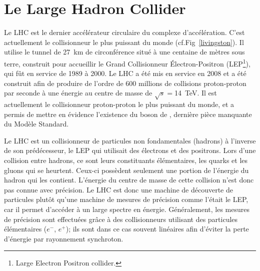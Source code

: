 \section{Le Large Hadron Collider}
Le LHC est le dernier accélérateur circulaire du complexe d'accélération. C'est actuellement le collisionneur le plus puissant du monde (cf.Fig~\ref{livingston}). Il utilise le tunnel de \SI{27}{\kilo\meter} de circonférence situé à une centaine de mètres sous terre, construit pour accueillir le Grand Collisionneur Électron-Positron (LEP\footnote{Large Electron Positron collider.}), qui fût en service de \num{1989} à \num{2000}. Le LHC a été mis en service en \num{2008} et a été construit afin de produire de l'ordre de \num{600} millions de collisions proton-proton par seconde à une énergie au centre de masse de $\sqrt{s}=$\SI{14}{\tera\eV}. Il est actuellement le collisionneur proton-proton le plus puissant du monde, et a permis de mettre en évidence l'existence du boson de , dernière pièce manquante du Modèle Standard.

Le LHC est un collisionneur de particules non fondamentales (hadrons) à l'inverse de son prédécesseur, le LEP qui utilisait des électrons et des positrons. Lors d'une collision entre hadrons, ce sont leurs constituants élémentaires, les quarks et les gluons qui se heurtent. Ceux-ci possèdent seulement une portion de l'énergie du hadron qui les contient. L'énergie du centre de masse de cette collision n'est donc pas connue avec précision. Le LHC est donc une machine de découverte de particules plutôt qu'une machine de mesures de précision comme l'était le LEP, car il permet d'accéder à un large spectre en énergie. Généralement, les mesures de précision sont effectuées grâce à des collisionneurs utilisant des particules élémentaires ($e^{-}$, $e^{+}$); ils sont dans ce cas souvent linéaires afin d'éviter la perte d'énergie par rayonnement synchroton.

